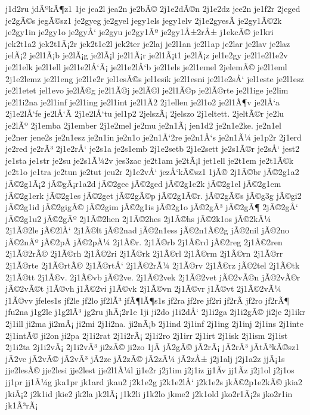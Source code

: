 {j1d2ru
jdÃºkÃ¶z1
1je
jea2l
jea2n
je2bÃ©
2j1e2dÃ©n
2j1e2dz
jee2n
je1f2r
2jeged
je2gÃ©s
jegÃ©sz1
je2gyeg
je2gyel
jegy1els
jegy1elv
2j1e2gyesÃ­
je2gy1Ã©2k
je2gy1in
je2gy1o
je2gyÅ‘
je2gyu
je2gy1Ãº
je2gy1Å±2rÅ±
j1ekcÃ©
je1kri
jek2t1a2
jek2t1Ã¡2r
jek2t1e2l
jek2ter
je2laj
je2l1an
je2l1ap
je2lar
je2lav
je2laz
jelÃ¡2
je2l1Ã¡b
je2lÃ¡g
je2lÃ¡l
je2l1Ã¡r
je2l1Ã¡t1
je2lÃ¡z
jel1e2gy
je2l1e2l1e2v
je2l1elk
je2l1ell
je2l1e2lÅ‘Ã¡
je2l1e2lÅ‘b
je2l1els
je2l1emel
2jelemÃ©
je2l1eml
2j1e2lemz
je2l1eng
je2l1e2r
jel1esÃ©s
jel1esik
je2l1esni
je2l1e2sÅ‘
jel1este
je2l1esz
je2l1etet
jel1evo
je2lÃ©g
je2l1Ã©j
je2lÃ©l
je2l1Ã©p
je2lÃ©rte
je2l1ige
je2lim
je2l1i2na
je2l1inf
je2l1ing
je2l1int
je2l1Ã­2
2j1ellen
je2l1o2
je2l1Ã¶v
je2lÅ‘a
2j1e2lÅ‘fe
je2lÅ‘Ã­
2j1e2lÅ‘tu
jel1p2
2jelszÃ¡
2jelszo
2j1eltett.
2jeltÃ©r
je2lu
je2lÃº
2j1emba
2j1ember
2j1e2mel
je2mu
je2n1Ã¡
jen1d2
je2n1e2ke.
je2n1el
je2ner
jene2s
je2n1esz
je2n1in
je2n1o
je2n1Å‘2re
je2n1Å‘s
je2n1Ã¼
je1p2r
2j1erd
je2red
je2rÃ³
2j1e2rÅ‘
je2s1a
je2s1emb
2j1e2setb
2j1e2sett
je2s1Ã©r
je2sÅ‘
jest2
je1sta
je1str
je2su
je2s1Ã¼2v
jes3zac
je2t1am
je2tÃ¡l
jet1ell
je2t1em
je2t1Ã©k
je2t1o
je1tra
je2tun
je2tut
jeu2r
2j1e2vÅ‘
jezÅ‘kÃ©sz1
1jÃ©
2j1Ã©br
jÃ©2g1a2
jÃ©2g1Ã¡2
jÃ©gÃ¡r1a2d
jÃ©2gec
jÃ©2ged
jÃ©2g1e2k
jÃ©2g1el
jÃ©2g1em
jÃ©2g1erk
jÃ©2g1es
jÃ©2get
jÃ©2gÃ©p
jÃ©2g1Ã©r.
jÃ©2gÃ©s
jÃ©g3g
jÃ©gi2
jÃ©2g1id
jÃ©2gigÃ©
jÃ©2gim
jÃ©2g1is
jÃ©2g1o
jÃ©2gÃ³
jÃ©2gÃ¶
2jÃ©2gÅ‘
jÃ©2g1u2
jÃ©2gÃº
2j1Ã©2hen
2j1Ã©2hes
2j1Ã©hs
jÃ©2k1os
jÃ©2kÃ¼
2j1Ã©2le
jÃ©2lÅ‘
2j1Ã©lt
jÃ©2nad
jÃ©2n1ess
jÃ©2n1Ã©2g
jÃ©2nil
jÃ©2no
jÃ©2nÃº
jÃ©2pÃ­
jÃ©2pÃ¼
2j1Ã©r.
2j1Ã©rb
2j1Ã©rd
jÃ©2reg
2j1Ã©2ren
2j1Ã©2rÃ©
2j1Ã©rh
2j1Ã©2ri
2j1Ã©rk
2j1Ã©rl
2j1Ã©rm
2j1Ã©rn
2j1Ã©rr
2j1Ã©rte
2j1Ã©rtÃ©
2j1Ã©rtÅ‘
2j1Ã©2rÃ¼
2j1Ã©rv
2j1Ã©rz
jÃ©2tel
2j1Ã©tk
2j1Ã©tt
2j1Ã©v.
2j1Ã©vb
jÃ©2ve.
2j1Ã©2vek
2j1Ã©2vet
jÃ©2vÃ©n
jÃ©2vÃ©r
jÃ©2vÃ©t
j1Ã©vh
j1Ã©2vi
j1Ã©vk
2j1Ã©vn
2j1Ã©vr
j1Ã©vt
2j1Ã©2vÃ¼
j1Ã©vv
jfeles1s
jf2le
jf2lo
jf2lÃ³
jfÃ¶lÃ¶s1s
jf2ra
jf2re
jf2ri
jf2rÃ­
jf2ro
jf2rÃ¶
jfu2na
j1g2le
j1g2lÃ³
jg2ru
jhÃ¡2r1e
1ji
ji2do
j1i2dÅ‘
2j1i2ga
2j1i2gÃ©
ji2je
2j1ikr
2j1ill
ji2ma
ji2mÃ¡
ji2mi
2j1i2na.
ji2nÃ¡b
2j1ind
2j1inf
2j1ing
2j1inj
2j1ins
2j1inte
2j1intÃ©
ji2on
ji2pa
2j1i2rat
2j1i2rÃ¡
2j1i2ro
2j1irr
2j1irt
2j1isk
2j1ism
2j1ist
2j1i2ta
2j1i2vÃ¡
2j1i2vÃ³
ji2zÃ©
ji2zo
1jÃ­
jÃ­2gÃ©
jÃ­2rÃ¡
jÃ­2rÃ³
jÃ­tÃ³kÃ©sz1
jÃ­2ve
jÃ­2vÃ©
jÃ­2vÃ³
jÃ­2ze
jÃ­2zÃ©
jÃ­2zÃ¼
jÃ­2zÅ±
j2j1alj
j2j1a2z
jjÃ¡1s
jje2lesÃ©
jje2lesi
jje2lest
jje2l1Ã¼l
jj1e2r
j2j1im
j2j1iz
jj1Ã­v
jj1Ã­z
j2j1ol
j2j1os
jj1pr
jj1Ã¼g
jka1pr
jk1ard
jkau2
j2k1e2g
j2k1e2lÅ‘
j2k1e2s
jkÃ©2p1e2kÃ©
jkia2
jkiÃ¡2
j2k1id
jkie2
jk2la
jk2lÃ¡
j1k2li
j1k2lo
jkme2
j2k1old
jko2r1Ã¡2s
jko2r1in
jk1Ã³rÃ¡
}
